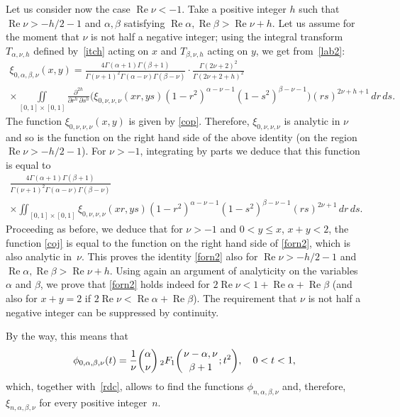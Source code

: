 \documentclass[10pt,leqno,a4paper]{article}
\theoremstyle{plain}
\renewcommand{\Re}{\operatorname{Re}}
\numberwithin{equation}{section}
\newcommand{\FF}[3]{{}_{2}F_{1}%
  \mathopen{}\left(\genfrac{}{}{0pt}{}{#1}{#2};#3\right)\mathclose{}}
\begin{document}
Let us consider now the case $\Re \nu<-1$. Take a positive integer $h$ such that $\Re \nu >-h/2-1$ and $\alpha,\beta $ satisfying $\Re\alpha, \Re \beta >\Re \nu+h$. Let us assume for the moment that $\nu$ is not half a negative integer; using the integral transform $T_{\alpha,\nu,h}$ defined by~\eqref{itch} acting on $x$ and $T_{\beta,\nu,h}$ acting on $y$, we get from~\eqref{lab2}:
\begin{multline*}
   \xi_{0,\alpha,\beta,\nu}(x,y)
   = \frac{4\Gamma(\alpha+1)\Gamma(\beta+1)}
   {\Gamma(\nu+1)^2\Gamma(\alpha-\nu)\Gamma(\beta-\nu)}
   \cdot \frac{\Gamma(2\nu+2)^2}{\Gamma(2\nu+2+h)^2}
   \\
   \times \iint\limits_{[0,1]\times[0,1]}
   \frac{\partial ^{2h}}{\partial r^h\,\partial s^h}
   \Big(\xi_{0,\nu,\nu,\nu}(x r, ys)(1-r^2)^{\alpha-\nu-1}(1-s^2)^{\beta-\nu-1}\Big)
   (rs)^{2\nu +h+1} \, dr \, ds.
\end{multline*}
The function $\xi_{0,\nu,\nu,\nu}(x, y)$ is given by \eqref{cop}. Therefore, $\xi_{0,\nu,\nu,\nu}$ is analytic in $\nu$ and so is the function on the right hand side of the above identity (on the region $\Re \nu >-h/2-1$). For $\nu>-1$, integrating by parts we deduce that this function is equal to
\begin{multline}
\label{coj}
   \frac{4\Gamma(\alpha+1)\Gamma(\beta+1)}{\Gamma(\nu+1)^2\Gamma(\alpha-\nu)\Gamma(\beta-\nu)}
   \\
   \times \iint_{[0,1]\times[0,1]}
   \xi_{0,\nu,\nu,\nu}(xr, ys) (1-r^2)^{\alpha-\nu-1} (1-s^2)^{\beta-\nu-1} (rs)^{2\nu +1}
   \, dr \, ds.
\end{multline}
Proceeding as before, we deduce that for $\nu>-1$ and $0<y\leq x$, $x+y<2$, the function \eqref{coj} is equal to the function on the right hand side of \eqref{forn2}, which is also analytic in~$\nu$. This proves the identity \eqref{forn2} also for $\Re \nu >-h/2-1$ and $\Re\alpha, \Re \beta>\Re \nu+h$. Using again an argument of analyticity on the variables $\alpha$ and $\beta$, we prove that \eqref{forn2} holds indeed for $2\Re \nu <1+\Re \alpha+\Re \beta$ (and also for $x+y=2$ if $2\Re \nu <\Re \alpha+\Re \beta$). The requirement that $\nu$ is not half a negative integer can be suppressed by continuity.

By the way, this means that
\begin{equation}
\label{phi0}
   \phi_{0,\alpha,\beta,\nu}(t)
   = \frac{1}{\nu} \binom{\alpha}{\nu}
   \,\FF{\nu-\alpha,\nu}{\beta+1}{t^2},
   \quad 0<t<1,
\end{equation}
which, together with~\eqref{rdc}, allows to find the functions $\phi_{n,\alpha,\beta,\nu}$ and, therefore, $\xi_{n,\alpha,\beta,\nu}$ for every positive integer~$n$.
\end{document}
